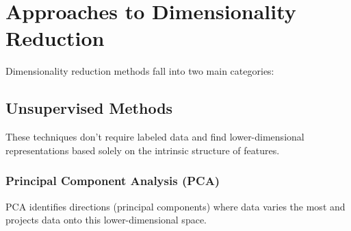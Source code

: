 \documentclass[
  letterpaper,
  DIV=11,
  numbers=noendperiod]{scrreprt}
\begin{document}
\section{Approaches to Dimensionality
Reduction}\label{approaches-to-dimensionality-reduction}

Dimensionality reduction methods fall into two main categories:

\subsection{Unsupervised Methods}\label{unsupervised-methods}

These techniques don't require labeled data and find lower-dimensional
representations based solely on the intrinsic structure of features.

\subsubsection{Principal Component Analysis
(PCA)}\label{principal-component-analysis-pca}

PCA identifies directions (principal components) where data varies the
most and projects data onto this lower-dimensional space.
\end{document}
